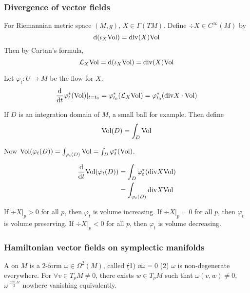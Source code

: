 \subsubsection{Divergence of vector fields}
\begin{definition}
    For Riemannian metric space  $ (M,g) $,  $ X\in \Gamma(TM) $. Define  $ \div X\in C^\infty(M)$ by 
    \begin{equation}
        \mathrm{d}(\iota_X \mathrm{Vol})=\mathrm{div}(X)\mathrm{Vol}\label{eq:def of divergence}
    \end{equation}
    Then by Cartan's formula, 
    \begin{equation}\label{eq:Lie derivative of volume form}
        \mathcal{L}_X\mathrm{Vol}=\mathrm{d}(\iota_X\mathrm{Vol})=\mathrm{div}(X)\mathrm{Vol}
    \end{equation}
\end{definition}
Let  $ \varphi_t:U\rightarrow M $ be the flow for  $ X $.
\begin{equation}
    \frac{\mathrm{d} }{\mathrm{d} t}\varphi_t^*(\mathrm{Vol})|_{t=t_0}=\varphi_{t_0}^*(\mathcal{L}_X\mathrm{Vol})=\varphi_{t_0}^*(\mathrm{div} X\cdot \mathrm{Vol})
\end{equation}  

If  $ D  $ is an integration domain of  $ M $,  a small ball for example. Then define 
\begin{equation}
    \name{$ \Vol(D) $}=\int_D\Vol
\end{equation}

Now  $ \mathrm{Vol}(\varphi_t(D))=\int_{\varphi_t(D)}\mathrm{Vol}=\int_D\varphi_t^*(\mathrm{Vol}) $.

\begin{equation}
    \begin{aligned}
        \frac{\mathrm{d} }{\mathrm{d} t}\mathrm{Vol}(\varphi_t(D))&=\int_D\varphi_t^*(\mathrm{div} X\mathrm{Vol})\\
        &=\int_{\varphi_t(D)}\mathrm{div} X\mathrm{Vol}
    \end{aligned}
\end{equation}

If  $ \div X|_p>0 $ for all  $ p $, then  $ \varphi_t $ is volume increasing. If  $ \div X|_p=0 $ for all  $ p $, then  $ \varphi_t $ is volume preserving. If  $ \div X|_p<0 $ for all  $ p  $, then  $ \varphi_t  $ is volume decreasing. 

\subsubsection{Hamiltonian vector fields on symplectic manifolds}
A  on  $ M  $  is a  $ 2 $-form  $ \omega\in \Omega^2(M) $, called  \st (1)  $ \dd\omega=0 $ (2) $ \omega  $ is non-degenerate everywhere. \ie For  $ \forall v\in T_pM\neq 0 $, there exists  $ w\in T_pM $ such that  $ \omega(v,w)\neq 0 $,  $ \omega^{\frac{\dim M}{2}} $ nowhere vanishing equivalently.   


